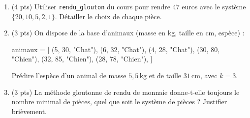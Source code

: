 \begin{enumerate}
  \item (4 pts) Utiliser \lstinline{rendu_glouton} du cours pour rendre $47$ euros avec le système $\{20, 10, 5, 2, 1\}$. Détailler le choix de chaque pièce.
  \item (3 pts) On dispose de la base d'animaux (masse en kg, taille en cm, espèce) :
\begin{python}
animaux = [
    (5, 30, "Chat"), (6, 32, "Chat"), (4, 28, "Chat"),
    (30, 80, "Chien"), (32, 85, "Chien"), (28, 78, "Chien"),
]
\end{python}
  Prédire l'espèce d'un animal de masse $5{,}5$\,kg et de taille $31$\,cm, avec $k=3$.
  \item (3 pts) La méthode gloutonne de rendu de monnaie donne-t-elle toujours le nombre minimal de pièces, quel que soit le système de pièces ? Justifier brièvement.
\end{enumerate}

